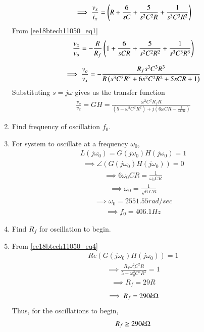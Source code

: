 \begin{enumerate}[label=\arabic*.,ref=\theenumi]
\begin{align}
    \implies\frac{v_x}{i_x} = \left(R+\frac{6}{sC}+\frac{5}{s^2C^2R}+\frac{1}{s^3C^3R^2}\right)
\end{align}
From \eqref{ee18btech11050_eq1}
\begin{align}
    \frac{v_x}{v_o} = -\frac{R}{R_f}\left(1+\frac{6}{sCR}+\frac{5}{s^2C^2R^2}+\frac{1}{s^3C^3R^3}\right)
\end{align}

\begin{align}
    \implies \frac{v_o}{v_x} = -\frac{R_fs^3C^3R^3}{R\left(s^3C^3R^3+6s^2C^2R^2+5sCR+1\right)}
\end{align}
Substituting $s=j\omega$ gives us the transfer function
\begin{align}
    \frac{v_o}{v_x} = GH = \frac{\omega^2C^2R_fR}{(5-\omega^2C^2R^2)+j(6\omega CR-\frac{1}{\omega CR})}
    \label{ee18btech11050_eq2}
\end{align}

\item Find frequency of oscillation $f_0$.
\item \solution 
For system to oscillate at a frequency $\omega_0$, 
\begin{align}
    L(j\omega_0) = G(j\omega_0)H(j\omega_0) = 1
    \label{ee18btech11050_eq4}
\end{align}
\begin{align}
    \implies \angle(G(j\omega_0)H(j\omega_0)) = 0
\end{align}
\begin{align}
    \implies 6\omega_0 CR = \frac{1}{\omega_0 CR}
\end{align}
\begin{align}
    \implies \omega_0 = \frac{1}{\sqrt{6}CR}
\end{align}
\begin{align}
    \implies \omega_0 = 2551.55 rad/sec
\end{align}
\begin{align}
    \implies f_0 = 406.1 Hz
\end{align}
\item Find $R_f$ for oscillation to begin.
\item \solution From \eqref{ee18btech11050_eq4}
\begin{align}
    Re(G(j\omega_0)H(j\omega_0)) = 1
\end{align}
\begin{align}
    \implies \frac{R_f\omega_0^2C^2R}{5-\omega_0^2C^2R^2} = 1
\end{align}
\begin{align}
    \implies R_f = 29R
\end{align}
\begin{align}
    \implies R_f = 290 k\ohm
\end{align}
Thus, for the oscillations to begin,
\begin{align}
    R_f \geq 290 k\ohm
\end{align}


\end{enumerate}
